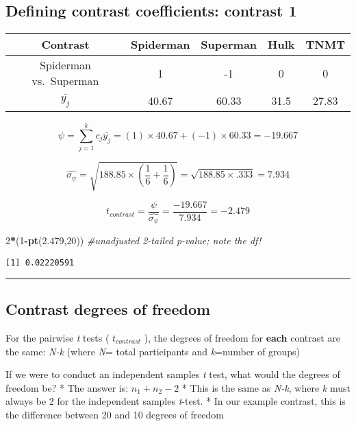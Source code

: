 \documentclass[]{article}
\newenvironment{Shaded}{\begin{snugshade}}{\end{snugshade}}
\newcommand{\CommentTok}[1]{\textcolor[rgb]{0.56,0.35,0.01}{\textit{#1}}}
\newcommand{\DecValTok}[1]{\textcolor[rgb]{0.00,0.00,0.81}{#1}}
\newcommand{\FloatTok}[1]{\textcolor[rgb]{0.00,0.00,0.81}{#1}}
\newcommand{\KeywordTok}[1]{\textcolor[rgb]{0.13,0.29,0.53}{\textbf{#1}}}
\newcommand{\NormalTok}[1]{#1}
\newcommand{\OperatorTok}[1]{\textcolor[rgb]{0.81,0.36,0.00}{\textbf{#1}}}
\begin{document}
\hypertarget{defining-contrast-coefficients-contrast-1}{%
\subsection{Defining contrast coefficients: contrast
1}\label{defining-contrast-coefficients-contrast-1}}

\begin{longtable}[]{@{}ccccc@{}}
\toprule
Contrast & Spiderman & Superman & Hulk & TNMT\tabularnewline
\midrule
\endhead
Spiderman vs.~Superman & 1 & -1 & 0 & 0\tabularnewline
\(\bar{y_j}\) & 40.67 & 60.33 & 31.5 & 27.83\tabularnewline
\bottomrule
\end{longtable}

\[\psi=\sum_{j=1}^kc_j\bar{y_j}=(1)\times{40.67}+(-1)\times{60.33}=-19.667\]

\[\hat{\sigma_{\psi}}=\sqrt{188.85\times{(\frac{1}{6}+\frac{1}{6})}}=\sqrt{188.85\times{.333}}=7.934\]

\[t_{contrast}=\frac{\psi}{\hat{\sigma_{\psi}}}=\frac{-19.667}{7.934}=-2.479\]

\begin{Shaded}
\begin{Highlighting}[]
\DecValTok{2}\OperatorTok{*}\NormalTok{(}\DecValTok{1}\OperatorTok{-}\KeywordTok{pt}\NormalTok{(}\FloatTok{2.479}\NormalTok{,}\DecValTok{20}\NormalTok{)) }\CommentTok{#unadjusted 2-tailed p-value; note the df!}
\end{Highlighting}
\end{Shaded}

\begin{verbatim}
[1] 0.02220591
\end{verbatim}

\begin{center}\rule{0.5\linewidth}{\linethickness}\end{center}

\hypertarget{contrast-degrees-of-freedom}{%
\subsection{Contrast degrees of
freedom}\label{contrast-degrees-of-freedom}}

For the pairwise \emph{t} tests ( \(t_{contrast}\) ), the degrees of
freedom for \textbf{each} contrast are the same: \emph{N-k} (where
\emph{N}= total participants and \emph{k}=number of groups)

If we were to conduct an independent samples \emph{t} test, what would
the degrees of freedom be? * The answer is: \(n_1+n_2-2\) * This is the
same as \emph{N-k}, where \emph{k} must always be 2 for the independent
samples \emph{t}-test. * In our example contrast, this is the difference
between 20 and 10 degrees of freedom
\end{document}
